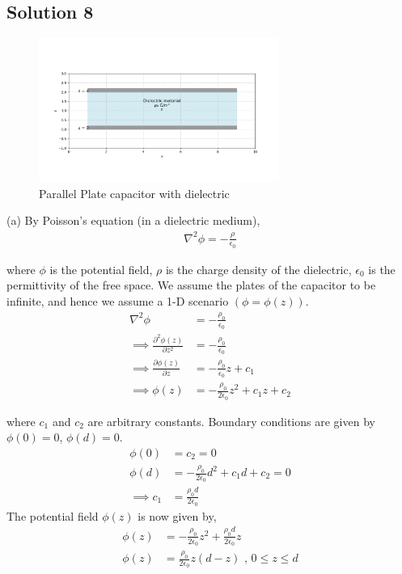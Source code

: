 \documentclass[12pt]{article}
\providecommand{\brak}[1]{\ensuremath{\left(#1\right)}}
\begin{document}
\subsection*{Solution 8}
\begin{figure}
    \begin{center}
        \includegraphics[width=0.7\textwidth]{./q8/fig.png}
    \end{center}
    \caption{Parallel Plate capacitor with dielectric}
\end{figure}


(a) By Poisson's equation (in a dielectric medium),
\begin{align*}
    \nabla^2 \phi = -\frac{\rho}{\epsilon_0}
\end{align*}

where $\phi$ is the potential field, $\rho$ is the charge density of the dielectric, $\epsilon_0$ is the permittivity of the free space.
\newline
We assume the plates of the capacitor to be infinite, and hence we assume a 1-D scenario \brak{\phi = \phi\brak{z}}.
\begin{align*}
    \nabla^2 \phi &= - \frac{\rho_0}{\epsilon_0}\\
    \implies \frac{\partial^2 \phi\brak{z}}{\partial z^2} &= - \frac{\rho_0}{\epsilon_0}\\
    \implies \frac{\partial \phi\brak{z}}{\partial z} &= - \frac{\rho_0}{\epsilon_0} z + c_1\\
    \implies \phi \brak{z} &= -\frac{\rho_0}{2\epsilon_0} z^2 + c_1 z + c_2
\end{align*}

where $c_1$ and $c_2$ are arbitrary constants.
\newline
Boundary conditions are given by $\phi\brak{0} = 0$, $\phi\brak{d} = 0$.
\begin{align*}
    \phi\brak{0} &= c_2 = 0\\
    \phi\brak{d} &= -\frac{\rho_0}{2\epsilon_0} d^2 + c_1 d + c_2 = 0\\
    \implies c_1 &= \frac{\rho_0 d}{2\epsilon_0}
\end{align*}
The potential field $\phi\brak{z}$ is now given by,
\begin{align*}
    \phi\brak{z} &= -\frac{\rho_0}{2\epsilon_0} z^2 + \frac{\rho_0 d}{2\epsilon_0}z\\
    \phi\brak{z} &= \frac{\rho_0}{2\epsilon_0} z\brak{d-z} \text{ , } 0 \leq z \leq d
\end{align*}
\end{document}
